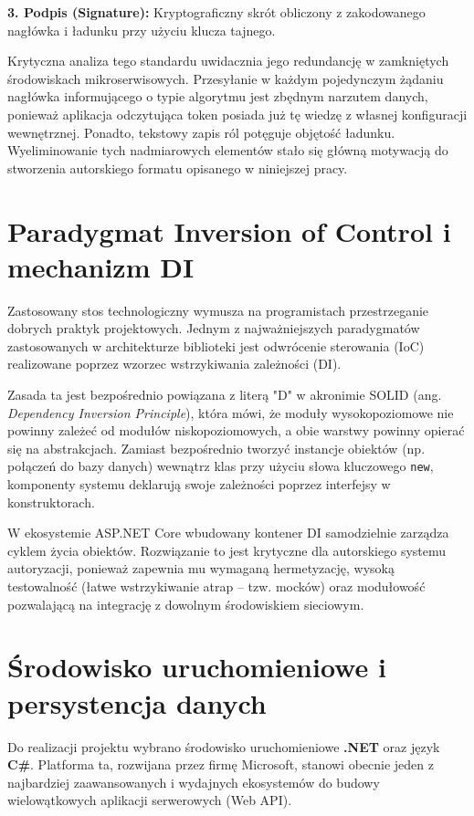 \documentclass{SGGW-thesis}
\begin{document}
\textbf{3. Podpis (Signature):} Kryptograficzny skrót obliczony z zakodowanego nagłówka i ładunku przy użyciu klucza tajnego.

Krytyczna analiza tego standardu uwidacznia jego redundancję w zamkniętych środowiskach mikroserwisowych. Przesyłanie w każdym pojedynczym żądaniu nagłówka informującego o typie algorytmu jest zbędnym narzutem danych, ponieważ aplikacja odczytująca token posiada już tę wiedzę z własnej konfiguracji wewnętrznej. Ponadto, tekstowy zapis ról potęguje objętość ładunku. Wyeliminowanie tych nadmiarowych elementów stało się główną motywacją do stworzenia autorskiego formatu opisanego w niniejszej pracy.

\section{Paradygmat Inversion of Control i mechanizm DI}

Zastosowany stos technologiczny wymusza na programistach przestrzeganie dobrych praktyk projektowych. Jednym z najważniejszych paradygmatów zastosowanych w architekturze biblioteki jest odwrócenie sterowania (IoC) realizowane poprzez wzorzec wstrzykiwania zależności (DI). 

Zasada ta jest bezpośrednio powiązana z literą "D" w akronimie SOLID (ang. \textit{Dependency Inversion Principle}), która mówi, że moduły wysokopoziomowe nie powinny zależeć od modułów niskopoziomowych, a obie warstwy powinny opierać się na abstrakcjach. Zamiast bezpośrednio tworzyć instancje obiektów (np. połączeń do bazy danych) wewnątrz klas przy użyciu słowa kluczowego \texttt{new}, komponenty systemu deklarują swoje zależności poprzez interfejsy w konstruktorach.

W ekosystemie ASP.NET Core wbudowany kontener DI samodzielnie zarządza cyklem życia obiektów. Rozwiązanie to jest krytyczne dla autorskiego systemu autoryzacji, ponieważ zapewnia mu wymaganą hermetyzację, wysoką testowalność (łatwe wstrzykiwanie atrap – tzw. mocków) oraz modułowość pozwalającą na integrację z dowolnym środowiskiem sieciowym.

\section{Środowisko uruchomieniowe i persystencja danych}

Do realizacji projektu wybrano środowisko uruchomieniowe \textbf{.NET} oraz język \textbf{C\#}. Platforma ta, rozwijana przez firmę Microsoft, stanowi obecnie jeden z najbardziej zaawansowanych i wydajnych ekosystemów do budowy wielowątkowych aplikacji serwerowych (Web API).
\end{document}
